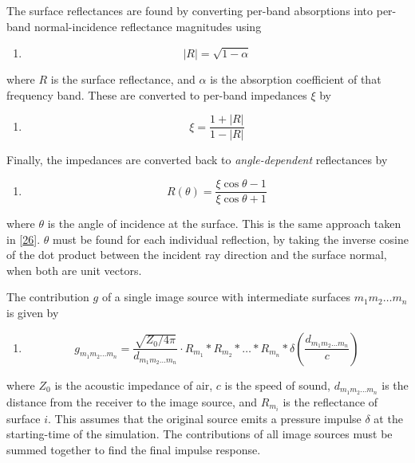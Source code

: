 \documentclass[]{scrreprt}
\providecommand{\tightlist}{%
  \setlength{\itemsep}{0pt}\setlength{\parskip}{0pt}}
\begin{document}
The surface reflectances are found by converting per-band absorptions
into per-band normal-incidence reflectance magnitudes using

\begin{enumerate}
\def\labelenumi{(\arabic{enumi})}
\tightlist
\item
  \[|R|=\sqrt{1-\alpha}\]
\end{enumerate}

where \(R\) is the surface reflectance, and \(\alpha\) is the absorption
coefficient of that frequency band. These are converted to per-band
impedances \(\xi\) by

\begin{enumerate}
\def\labelenumi{(\arabic{enumi})}
\setcounter{enumi}{1}
\tightlist
\item
  \[\xi=\frac{1+|R|}{1-|R|}\]
\end{enumerate}

Finally, the impedances are converted back to \emph{angle-dependent}
reflectances by

\begin{enumerate}
\def\labelenumi{(\arabic{enumi})}
\setcounter{enumi}{2}
\tightlist
\item
  \[R(\theta)=\frac{\xi\cos\theta-1}{\xi\cos\theta+1}\]
\end{enumerate}

where \(\theta\) is the angle of incidence at the surface. This is the
same approach taken in
{[}\protect\hyperlink{ref-southernux5froomux5f2013}{26}{]}. \(\theta\)
must be found for each individual reflection, by taking the inverse
cosine of the dot product between the incident ray direction and the
surface normal, when both are unit vectors.

The contribution \(g\) of a single image source with intermediate
surfaces \(m_1 m_2 \dots m_n\) is given by

\begin{enumerate}
\def\labelenumi{(\arabic{enumi})}
\setcounter{enumi}{3}
\tightlist
\item
  \[g_{m_1 m_2 \dots m_n} = \frac{\sqrt{Z_0/4\pi}}{d_{m_1 m_2 \dots m_n}}
  \cdot R_{m_1} \ast R_{m_2} \ast \dots \ast R_{m_n} \ast \delta(\frac{d_{m_1 m_2
  \dots m_n}}{c})\]
\end{enumerate}

where \(Z_0\) is the acoustic impedance of air, \(c\) is the speed of
sound, \(d_{m_1 m_2 \dots m_n}\) is the distance from the receiver to
the image source, and \(R_{m_i}\) is the reflectance of surface \(i\).
This assumes that the original source emits a pressure impulse
\(\delta\) at the starting-time of the simulation. The contributions of
all image sources must be summed together to find the final impulse
response.
\end{document}
